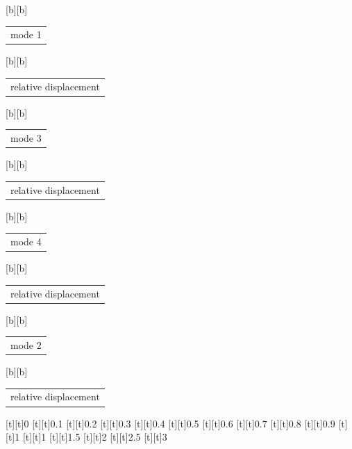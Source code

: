 %    
%
%
\begin{psfrags}%
\psfragscanon%
%
[b][b]{\color[rgb]{0,0,0}\setlength{\tabcolsep}{0pt}\begin{tabular}{c}mode 1\end{tabular}}%
[b][b]{\color[rgb]{0,0,0}\setlength{\tabcolsep}{0pt}\begin{tabular}{c}relative displacement\end{tabular}}%
[b][b]{\color[rgb]{0,0,0}\setlength{\tabcolsep}{0pt}\begin{tabular}{c}mode 3\end{tabular}}%
[b][b]{\color[rgb]{0,0,0}\setlength{\tabcolsep}{0pt}\begin{tabular}{c}relative displacement\end{tabular}}%
[b][b]{\color[rgb]{0,0,0}\setlength{\tabcolsep}{0pt}\begin{tabular}{c}mode 4\end{tabular}}%
[b][b]{\color[rgb]{0,0,0}\setlength{\tabcolsep}{0pt}\begin{tabular}{c}relative displacement\end{tabular}}%
[b][b]{\color[rgb]{0,0,0}\setlength{\tabcolsep}{0pt}\begin{tabular}{c}mode 2\end{tabular}}%
[b][b]{\color[rgb]{0,0,0}\setlength{\tabcolsep}{0pt}\begin{tabular}{c}relative displacement\end{tabular}}%
%
[t][t]{0}%
[t][t]{0.1}%
[t][t]{0.2}%
[t][t]{0.3}%
[t][t]{0.4}%
[t][t]{0.5}%
[t][t]{0.6}%
[t][t]{0.7}%
[t][t]{0.8}%
[t][t]{0.9}%
[t][t]{1}%
[t][t]{1}%
[t][t]{1.5}%
[t][t]{2}%
[t][t]{2.5}%
[t][t]{3}%

\end{psfrags}

